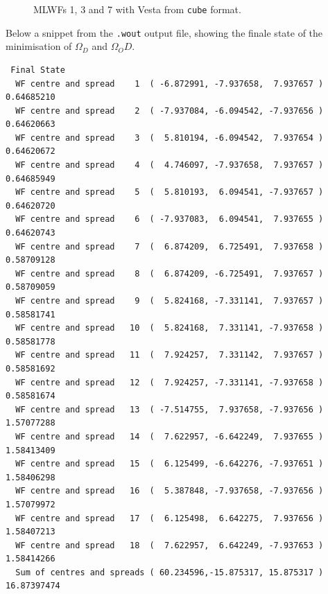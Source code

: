 \begin{itemize}
\begin{figure}[h!]
\centering
{}
\centering
{}
\centering
{}
\caption{MLWFs 1, 3 and 7 with Vesta from {\tt cube} format.}\label{fig12.3}
\end{figure}


Below a snippet from the {\tt .wout} output file, showing the finale state of the minimisation of $\Omega_D$ and $\Omega_OD$.
  \begin{tcolorbox}[floatplacement=h!,float,nobeforeafter,sharp corners,boxrule=0.5pt]
  {\small
\begin{verbatim}
 Final State
  WF centre and spread    1  ( -6.872991, -7.937658,  7.937657 )     0.64685210
  WF centre and spread    2  ( -7.937084, -6.094542, -7.937656 )     0.64620663
  WF centre and spread    3  (  5.810194, -6.094542,  7.937654 )     0.64620672
  WF centre and spread    4  (  4.746097, -7.937658,  7.937657 )     0.64685949
  WF centre and spread    5  (  5.810193,  6.094541, -7.937657 )     0.64620720
  WF centre and spread    6  ( -7.937083,  6.094541,  7.937655 )     0.64620743
  WF centre and spread    7  (  6.874209,  6.725491,  7.937658 )     0.58709128
  WF centre and spread    8  (  6.874209, -6.725491,  7.937657 )     0.58709059
  WF centre and spread    9  (  5.824168, -7.331141,  7.937657 )     0.58581741
  WF centre and spread   10  (  5.824168,  7.331141, -7.937658 )     0.58581778
  WF centre and spread   11  (  7.924257,  7.331142,  7.937657 )     0.58581692
  WF centre and spread   12  (  7.924257, -7.331141, -7.937658 )     0.58581674
  WF centre and spread   13  ( -7.514755,  7.937658, -7.937656 )     1.57077288
  WF centre and spread   14  (  7.622957, -6.642249,  7.937655 )     1.58413409
  WF centre and spread   15  (  6.125499, -6.642276, -7.937651 )     1.58406298
  WF centre and spread   16  (  5.387848, -7.937658, -7.937656 )     1.57079972
  WF centre and spread   17  (  6.125498,  6.642275,  7.937656 )     1.58407213
  WF centre and spread   18  (  7.622957,  6.642249, -7.937653 )     1.58414266
  Sum of centres and spreads ( 60.234596,-15.875317, 15.875317 )    16.87397474


\end{verbatim}}
\end{tcolorbox}
\end{itemize}
